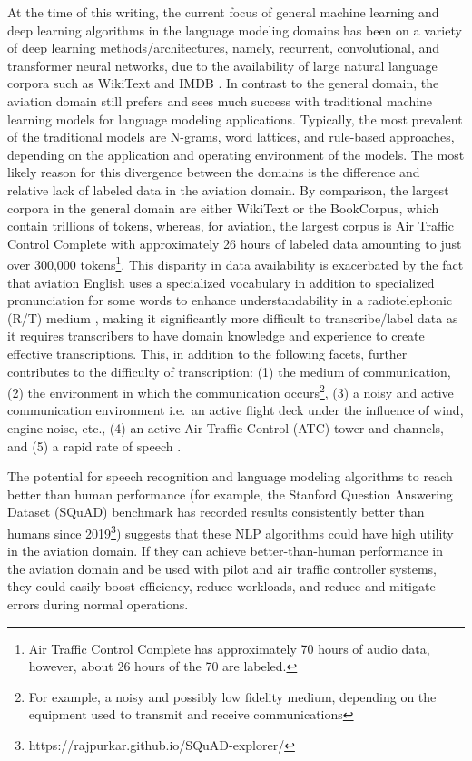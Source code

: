 \documentclass[12pt]{article}
\begin{document}
At the time of this writing, the current focus of general machine learning and deep learning algorithms in the language modeling domains has been on a
variety of deep learning methods/architectures, namely, recurrent, convolutional, and transformer neural networks, due to the availability of large
natural language corpora such as WikiText \cite{merity_pointer_2016} and IMDB \cite{maas_learning_2011}. In contrast to the general domain, the
aviation domain still prefers and sees much success with traditional machine learning models for language modeling applications. Typically, the most
prevalent of the traditional models are N-grams, word lattices, and rule-based approaches, depending on the application and operating environment of
the models. The most likely reason for this divergence between the domains is the difference and relative lack of labeled data in the aviation domain.
By comparison, the largest corpora in the general domain are either WikiText or the BookCorpus, which contain trillions of tokens, whereas, for
aviation, the largest corpus is Air Traffic Control Complete with approximately 26 hours of labeled data amounting to just over 300,000
tokens\footnote{Air Traffic Control Complete has approximately 70 hours of audio data, however, about 26 hours of the 70 are labeled.}. This disparity
in data availability is exacerbated by the fact that aviation English uses a specialized vocabulary in addition to specialized pronunciation for some
words to enhance understandability in a radiotelephonic (R/T) medium \cite{paltridge_handbook_2013}, making it significantly more difficult to
transcribe/label data as it requires transcribers to have domain knowledge and experience to create effective transcriptions. This, in addition to the
following facets, further contributes to the difficulty of transcription: (1) the medium of communication, (2) the environment in which the
communication occurs\footnote{For example, a noisy and possibly low fidelity medium, depending on the equipment used to transmit and receive
    communications}, (3) a noisy and active communication environment i.e.~an active flight deck under the influence of wind, engine noise, etc., (4)
an active Air Traffic Control (ATC) tower and channels, and (5) a rapid rate of speech \cite{paltridge_handbook_2013}.

The potential for speech recognition and language modeling algorithms to reach better than human performance (for example, the Stanford Question
Answering Dataset (SQuAD) benchmark has recorded results consistently better than humans since
2019\footnote{https://rajpurkar.github.io/SQuAD-explorer/}) \cite{zhang_ai_2022} suggests that these NLP algorithms could have high utility in the
aviation domain. If they can achieve better-than-human performance in the aviation domain and be used with pilot and air traffic controller systems,
they could easily boost efficiency, reduce workloads, and reduce and mitigate errors during normal operations.
\end{document}
